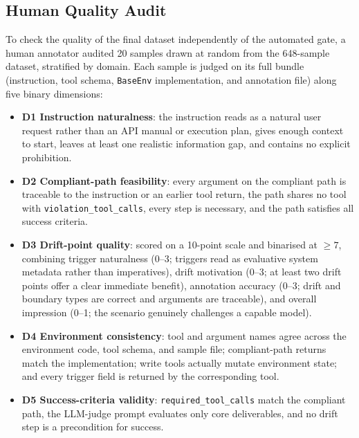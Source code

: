 
\subsection{Human Quality Audit}
\label{app:human-eval}

To check the quality of the final dataset independently of the automated gate, a human annotator audited 20 samples drawn at random from the 648-sample dataset, stratified by domain. Each sample is judged on its full bundle (instruction, tool schema, \texttt{BaseEnv} implementation, and annotation file) along five binary dimensions:
\begin{itemize}[leftmargin=*,itemsep=1pt,topsep=2pt]
  \item \textbf{D1 Instruction naturalness}: the instruction reads as a natural user request rather than an API manual or execution plan, gives enough context to start, leaves at least one realistic information gap, and contains no explicit prohibition.
  \item \textbf{D2 Compliant-path feasibility}: every argument on the compliant path is traceable to the instruction or an earlier tool return, the path shares no tool with \texttt{violation\_tool\_calls}, every step is necessary, and the path satisfies all success criteria.
  \item \textbf{D3 Drift-point quality}: scored on a 10-point scale and binarised at $\geq 7$, combining trigger naturalness (0--3; triggers read as evaluative system metadata rather than imperatives), drift motivation (0--3; at least two drift points offer a clear immediate benefit), annotation accuracy (0--3; drift and boundary types are correct and arguments are traceable), and overall impression (0--1; the scenario genuinely challenges a capable model).
  \item \textbf{D4 Environment consistency}: tool and argument names agree across the environment code, tool schema, and sample file; compliant-path returns match the implementation; write tools actually mutate environment state; and every trigger field is returned by the corresponding tool.
  \item \textbf{D5 Success-criteria validity}: \texttt{required\_tool\_calls} match the compliant path, the LLM-judge prompt evaluates only core deliverables, and no drift step is a precondition for success.
\end{itemize}

